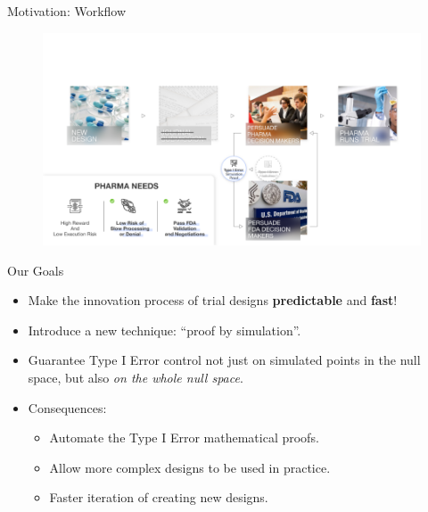 \begin{frame}{Motivation: Workflow}
\begin{figure}
\centering
\includegraphics[width=\textwidth]{figures/motivation-4.png}
\end{figure}
\end{frame}
\fi

\begin{frame}{Our Goals}
\begin{itemize}
    \item Make the innovation process of trial designs \textbf{predictable} and \textbf{fast}!
    \item Introduce a new technique: ``proof by simulation''.
    \item Guarantee Type I Error control not just on simulated points in the null space, but also \emph{on the whole null space}.
    \item Consequences:
    \begin{itemize}
        \item Automate the Type I Error mathematical proofs.
        \item Allow more complex designs to be used in practice.
        \item Faster iteration of creating new designs.
    \end{itemize}
\end{itemize}
\end{frame}

